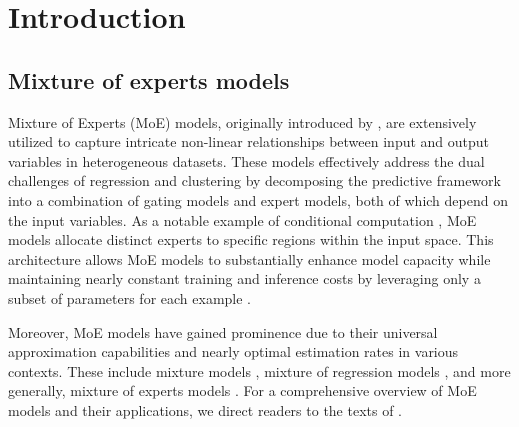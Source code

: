 \documentclass{article}
\begin{document}
\tableofcontents





\section{Introduction}

\subsection{Mixture of experts models}

Mixture of Experts (MoE) models, originally introduced by \cite{jacobs1991adaptive,jordan1994hierarchical}, are extensively utilized to capture intricate non-linear relationships between input and output variables in heterogeneous datasets. These models effectively address the dual challenges of regression and clustering by decomposing the predictive framework into a combination of gating models and expert models, both of which depend on the input variables. As a notable example of conditional computation \citep{bengio_deep_2013,chen_towards_2022}, MoE models allocate distinct experts to specific regions within the input space. This architecture allows MoE models to substantially enhance model capacity while maintaining nearly constant training and inference costs by leveraging only a subset of parameters for each example \citep{shazeer_outrageously_2017,fedus_switch_2022,dai_deepseekmoe_2024}.

Moreover, MoE models have gained prominence due to their universal approximation capabilities and nearly optimal estimation rates in various contexts. These include mixture models \citep{genovese2000rates,rakhlin2005risk, nguyen2013convergence, ho_convergence_2016, ho_strong_2016, nguyen_approximation_2020, nguyen_approximation_2022,chong_risk_2024}, mixture of regression models \citep{do_strong_2022,ho_convergence_2022}, and more generally, mixture of experts models \citep{jiang_hierarchical_1999, norets_approximation_2010, nguyen2016universal,nguyen2019approximation,nguyen_approximations_2021,nguyen_non_asymptotic_2022,nguyen_demystifying_2023,nguyen_bayesian_2024,nguyen_general_2024,nguyen_towards_2024,le_mixture_2024,thai_model_2025,hai_dendrograms_2026}. For a comprehensive overview of MoE models and their applications, we direct readers to the texts of \cite{yuksel2012twenty,masoudnia2014mixture,nguyen2018practical,nguyen_model_2021,cai_survey_2025}.

\end{document}
